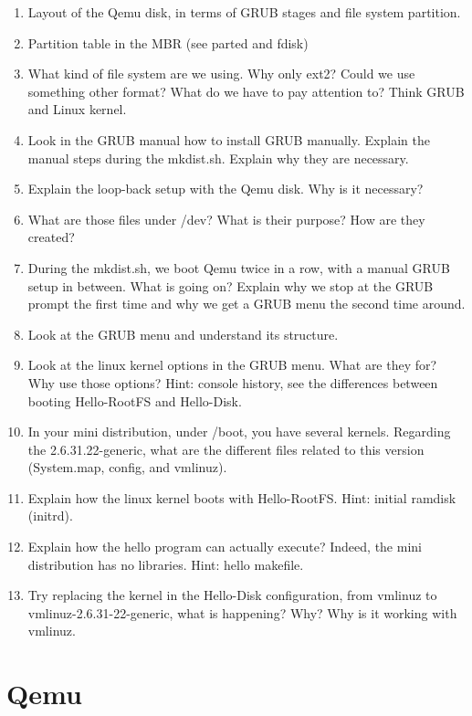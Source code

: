 \documentclass[10]{article}
\begin{document}
\begin{enumerate}
\item
Layout of the Qemu disk, in terms of GRUB stages and file system partition.
\item
Partition table in the MBR (see parted and fdisk)
\item 
What kind of file system are we using.
Why only ext2? Could we use something other format?
What do we have to pay attention to? Think GRUB
and Linux kernel.
\item
Look in the GRUB manual how to install GRUB manually.
Explain the manual steps during the mkdist.sh.
Explain why they are necessary. 
\item
Explain the loop-back setup with the Qemu disk.
Why is it necessary? 
\item 
What are those files under /dev?
What is their purpose? How are they created?
\item 
During the mkdist.sh, we boot Qemu twice in a row, 
with a manual GRUB setup in between.
What is going on? 
Explain why we stop at the GRUB prompt the first time
and why we get a GRUB menu the second time around.
\item 
Look at the GRUB menu and understand its structure.
\item 
Look at the linux kernel options in the GRUB menu.
What are they for? Why use those options?
Hint: console history, see the differences between
booting Hello-RootFS and Hello-Disk.
\item
In your mini distribution, under /boot, you have
several kernels. Regarding the 2.6.31.22-generic,
what are the different files related to this version
(System.map, config, and vmlinuz).
\item
Explain how the linux kernel boots with Hello-RootFS.
Hint: initial ramdisk (initrd).
\item
Explain how the hello program can actually execute?
Indeed, the mini distribution has no libraries.
Hint: hello makefile.
\item 
Try replacing the kernel in the Hello-Disk configuration,
from vmlinuz to vmlinuz-2.6.31-22-generic, what is happening?
Why? Why is it working with vmlinuz.

\end{enumerate}



\section{Qemu}
\end{document}
